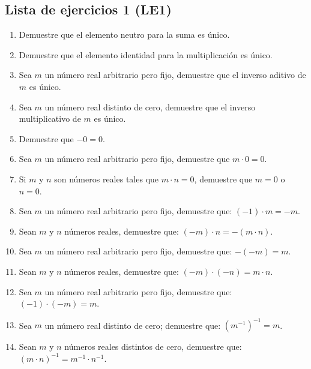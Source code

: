 \documentclass[11pt]{article}
\begin{document}
\subsection*{Lista de ejercicios 1 (LE1)}
    \begin{enumerate}[label=\alph*),font=\bfseries]
        \item Demuestre que el elemento neutro para la suma es único.
        \item Demuestre que el elemento identidad para la multiplicación es único.
        \item Sea $m$ un número real arbitrario pero fijo, demuestre que el inverso aditivo de $m$ es único.
        \item Sea $m$ un número real distinto de cero, demuestre que el inverso multiplicativo de $m$ es único.
        \item Demuestre que $-0 = 0$.
        \item Sea $m$ un número real arbitrario pero fijo, demuestre que $m \cdot 0 = 0$.
        \item Si $m$ y $n$ son números reales tales que $ m \cdot n = 0 $, demuestre que $m=0$ o $n=0$.
        \item Sea $m$ un número real arbitrario pero fijo, demuestre que: $(-1) \cdot m =-m $.
        \item Sean $m$ y $n$ números reales, demuestre que: $ (-m) \cdot n = -(m \cdot n) $.
        \item Sea $m$ un número real arbitrario pero fijo, demuestre que: $-(-m)=m$.
        \item Sean $m$ y $n$ números reales, demuestre que: $ (-m) \cdot (-n) = m \cdot n $.
        \item Sea $m$ un número real arbitrario pero fijo, demuestre que: $(-1) \cdot (-m)=m$.
        \item Sea $m$ un número real distinto de cero; demuestre que: $\left( m^{-1} \right )^{-1}=m$.
        \item Sean $m$ y $n$ números reales distintos de cero, demuestre que: $(m \cdot n)^{-1}=m^{-1} \cdot n^{-1}$.
    \end{enumerate}
\end{document}
